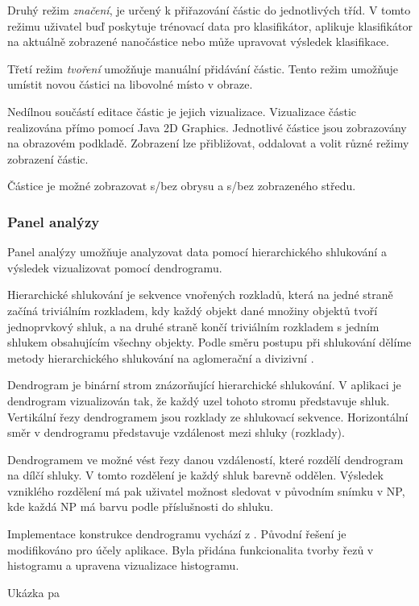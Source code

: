 \documentclass[11pt,twoside,a4paper,table]{book}
\begin{document}
Druhý režim \textit{značení}, je určený k přiřazování částic do jednotlivých tříd. V tomto režimu uživatel buď poskytuje trénovací data pro klasifikátor, aplikuje klasifikátor na aktuálně zobrazené nanočástice nebo může upravovat výsledek klasifikace.

Třetí režim \textit{tvoření} umožňuje manuální přidávání částic. Tento režim umožňuje umístit novou částici na libovolné místo v obraze.

Nedílnou součástí editace částic je jejich vizualizace. Vizualizace částic realizována přímo pomocí Java 2D Graphics. Jednotlivé částice jsou zobrazovány na obrazovém podkladě. Zobrazení lze přibližovat, oddalovat a volit různé režimy zobrazení částic.

Částice je možné zobrazovat s/bez obrysu a s/bez zobrazeného středu.

\subsubsection{Panel analýzy}
Panel analýzy umožňuje analyzovat data pomocí hierarchického shlukování a výsledek vizualizovat pomocí dendrogramu.

Hierarchické shlukování je sekvence vnořených rozkladů, která na jedné straně začíná triviálním rozkladem, kdy každý objekt dané množiny objektů tvoří jednoprvkový shluk, a na
druhé straně končí triviálním rozkladem s jedním shlukem obsahujícím všechny objekty.
Podle směru postupu při shlukování dělíme metody hierarchického shlukování na aglomerační
a divizivní \cite{on:shlukovani}.

Dendrogram je binární strom znázorňující hierarchické shlukování. V aplikaci je dendrogram vizualizován tak, že každý uzel tohoto stromu představuje shluk. Vertikální řezy dendrogramem jsou rozklady ze shlukovací sekvence. Horizontální směr v dendrogramu představuje vzdálenost mezi shluky (rozklady).

Dendrogramem ve možné vést řezy danou vzdáleností, které rozdělí dendrogram na dílčí shluky. V tomto rozdělení je každý shluk barevně oddělen. Výsledek vzniklého rozdělení má pak uživatel možnost sledovat v původním snímku v NP, kde každá NP má barvu podle příslušnosti do shluku.  

Implementace konstrukce dendrogramu vychází z \cite{on:shlukovani_java}. Původní řešení je modifikováno pro účely aplikace. Byla přidána funkcionalita tvorby řezů v histogramu a upravena vizualizace histogramu.

Ukázka pa
\end{document}
